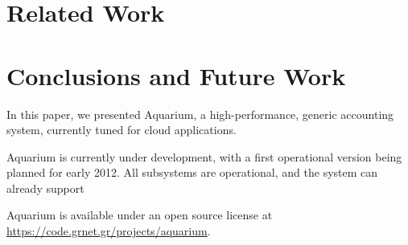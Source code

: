 \documentclass[preprint,10pt]{sigplanconf}
\begin{document}
\section{Related Work}

\section{Conclusions and Future Work}
In this paper, we presented Aquarium, a high-performance, generic accounting 
system, currently tuned for cloud applications.

Aquarium is currently under development, with a first operational version 
being planned for early 2012. All subsystems are operational, and the system
can already support 

Aquarium is available under an open source license at 
\url{https://code.grnet.gr/projects/aquarium}.



\end{document}
